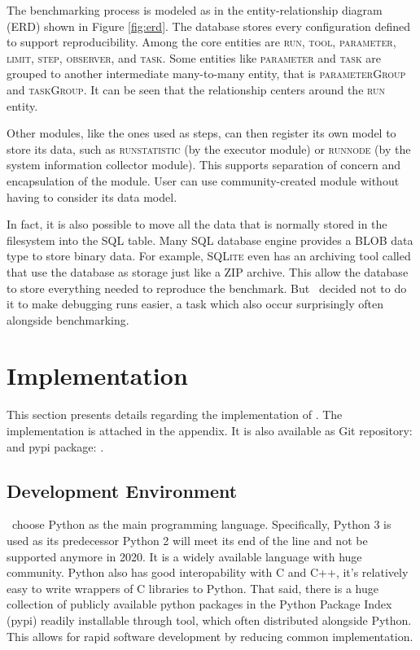 The benchmarking process is modeled as in the entity-relationship diagram (ERD) shown in Figure \ref{fig:erd}.
The database stores every configuration defined to support reproducibility.
Among the core entities are \textsc{run}, \textsc{tool}, \textsc{parameter}, \textsc{limit}, \textsc{step}, \textsc{observer}, and \textsc{task}.
Some entities like \textsc{parameter} and \textsc{task} are grouped to another intermediate many-to-many entity, that is \textsc{parameterGroup} and \textsc{taskGroup}.
It can be seen that the relationship centers around the \textsc{run} entity.

Other modules, like the ones used as steps, can then register its own model to store its data, such as \textsc{runstatistic} (by the executor module) or \textsc{runnode} (by the system information collector module).
This supports separation of concern and encapsulation of the module.
User can use community-created module without having to consider its data model.

In fact, it is also possible to move all the data that is normally stored in the filesystem into the SQL table.
Many SQL database engine provides a BLOB data type to store binary data.
For example, \textsc{SQLite} even has an archiving tool called  that use the database as storage just like a ZIP archive.
This allow the database to store everything needed to reproduce the benchmark.
But \first~decided not to do it to make debugging runs easier, a task which also occur surprisingly often alongside benchmarking.

\section{Implementation}

This section presents details regarding the implementation of \OurBenchmarkingTool.
The implementation is attached in the appendix.
It is also available as Git repository: \href{https://github.com/rkkautsar/reprobench}{} and pypi package: \href{https://pypi.org/project/reprobench/}{}.

\subsection{Development Environment}

\First~choose Python as the main programming language.
Specifically, Python 3 is used as its predecessor Python 2 will meet its end of the line and not be supported anymore in 2020.
It is a widely available language with huge community.
Python also has good interopability with C and C++, it's relatively easy to write wrappers of C libraries to Python.
That said, there is a huge collection of publicly available python packages in the Python Package Index (pypi) readily installable through  tool, which often distributed alongside Python.
This allows for rapid software development by reducing common implementation.

